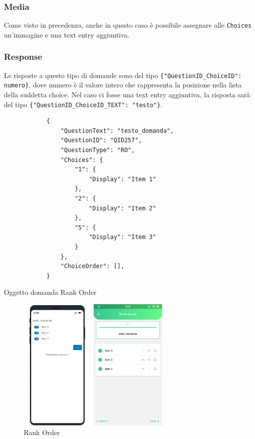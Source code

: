 \subsubsection{Media}
Come visto in precedenza, anche in questo caso è possibile assegnare alle \texttt{Choices} un'immagine e una text entry aggiuntiva.

\subsubsection{Response}
Le risposte a questo tipo di domande sono del tipo \texttt{\{"QuestionID\_ChoiceID": numero\}}, dove numero è il valore intero che rappresenta la posizione nella lista della suddetta choice. Nel caso ci fosse una text entry aggiuntiva, la risposta sarà del tipo \texttt{\{"QuestionID\_ChoiceID\_TEXT": "testo"\}}.

\newpage
\begin{json}
\begin{verbatim}
            {
                "QuestionText": "testo_domanda",
                "QuestionID": "QID257",
                "QuestionType": "RO",
                "Choices": {
                    "1": {
                        "Display": "Item 1"
                    },
                    "2": {
                        "Display": "Item 2"
                    },
                    "5": {
                        "Display": "Item 3"
                    }
                },
                "ChoiceOrder": [],
            }
\end{verbatim}
\caption{Oggetto domanda Rank Order}
\label{json:rank_order}
\end{json}

\begin{figure}[h!]
\centering
\includegraphics[width=0.66\textwidth]{img/rank_order}
\caption{Rank Order}
\label{fig:rank_order}
\end{figure}

